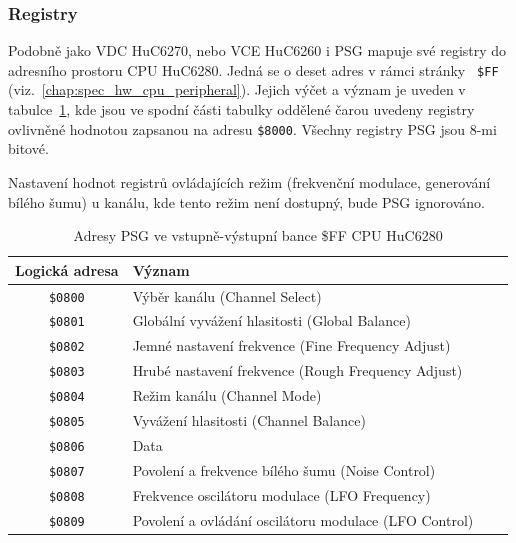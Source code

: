 
\subsubsection{Registry}\label{chap:spec_hw_psg_regs}

Podobně jako VDC HuC6270, nebo VCE HuC6260 i PSG mapuje své registry do
adresního prostoru CPU HuC6280. Jedná se o deset adres v rámci stránky {\tt
\$FF} (viz.~\ref{chap:spec_hw_cpu_peripheral}). Jejich výčet a význam je uveden v
tabulce~\ref{tab:psg_ffpage}, kde jsou ve spodní části tabulky oddělené čarou
uvedeny registry ovlivněné hodnotou zapsanou na adresu {\tt \$8000}. Všechny
registry PSG jsou 8-mi bitové.

Nastavení hodnot registrů ovládajících režim (frekvenční modulace, generování
bílého šumu) u kanálu, kde tento režim není dostupný, bude PSG ignorováno.

\begin{table}[ht]
\begin{center}
\begin{tabular}{|c|l|l|l|}
\hline
\textbf{Logická adresa} & \textbf{Význam} \\
\hline
	{\tt \$0800} & Výběr kanálu (Channel Select) \\
	{\tt \$0801} & Globální vyvážení hlasitosti (Global Balance) \\
\hline
	{\tt \$0802} & Jemné nastavení frekvence (Fine Frequency Adjust) \\
	{\tt \$0803} & Hrubé nastavení frekvence (Rough Frequency Adjust) \\
	{\tt \$0804} & Režim kanálu (Channel Mode) \\
	{\tt \$0805} & Vyvážení hlasitosti (Channel Balance) \\
	{\tt \$0806} & Data \\
	{\tt \$0807} & Povolení a frekvence bílého šumu (Noise Control) \\
	{\tt \$0808} & Frekvence oscilátoru modulace (LFO Frequency) \\
	{\tt \$0809} & Povolení a ovládání oscilátoru modulace (LFO Control) \\
\hline
\end{tabular}
\end{center}
	\caption{Adresy PSG ve vstupně-výstupní bance \$FF CPU
	HuC6280\label{tab:psg_ffpage}}
\end{table}

